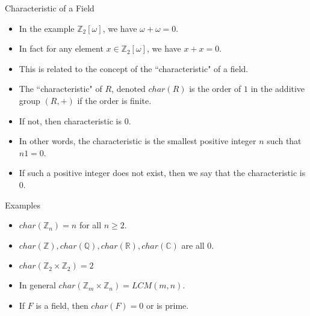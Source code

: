 \documentclass[ %
 10pt, xcolor={dvipsnames,svgnames,x11names,hyperref},
   hyperref={colorlinks=true,citecolor=green,linkcolor=DarkRed,urlcolor=ProcessBlue,anchorcolor=blue}
  ]{beamer}
\newenvironment{stepitemize}{\begin{itemize}[<+->]}{\end{itemize} }
\newcommand{\Z}{\mathbb{Z}}
\newcommand{\Q}{\mathbb{Q}}
\newcommand{\R}{\mathbb{R}}
\newcommand{\C}{\mathbb{C}}
\begin{document}
\begin{frame}{Characteristic of a Field}
    \begin{stepitemize}
        \item In the example $\Z_2[\omega]$, we have $\omega+\omega=0$.
        \item In fact for any element $x \in \Z_2[\omega]$, we have $x+x=0$.
        \item This is related to the concept of the ``characteristic" of a field.
        \item The ``characteristic" of $R$, denoted $char(R)$ is the order of $1$ in the additive group $(R,+)$ if the order is finite.
        \item If not, then characteristic is $0$.
\item In other words, the characteristic is the smallest positive integer $n$ such that $n1 =0$.
\item If such a positive integer does not exist, then we say that the characteristic is $0$.
    \end{stepitemize}
\end{frame}

\begin{frame}{Examples}
\begin{stepitemize}
   \item $char(\Z_n)=n$ for all $n\geq 2$.
    \item $char(\Z), char(\Q), char(\R), char(\C)$ are all $0$.
   \item $char(\Z_2\times \Z_2) = 2$
    \item In general $char(\Z_m\times \Z_n) = LCM(m,n)$.
\item If $F$ is a field, then $char(F)=0$ or is prime.
\end{stepitemize}
\end{frame}
\end{document}
